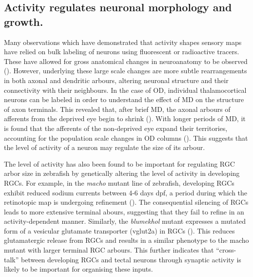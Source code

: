 \subsection{Activity regulates neuronal morphology and growth.}
Many observations which have demonstrated that activity shapes sensory maps have relied on bulk labeling of neurons using fluorescent or radioactive tracers. These have allowed for gross anatomical changes in neuroanatomy to be observed (\cite{Berry2016Experience-DependentSystem}). However, underlying these large scale changes are more subtle rearrangements in both axonal and dendritic arbours, altering neuronal structure and their connectivity with their neighbours. In the case of OD, individual thalamocortical neurons can be labeled in order to understand the effect of MD on the structure of axon terminals. This revealed that, after brief MD, the axonal arbours of afferents from the deprived eye begin to shrink (\cite{Antonini1993RapidCortex}). With longer periods of MD, it is found that the afferents of the non-deprived eye expand their territories, accounting for the population scale changes in OD columns (\cite{Antonini1996PlasticityCat.}). This suggests that the level of activity of a neuron may regulate the size of its arbour. 

The level of activity has also been found to be important for regulating RGC arbor size in zebrafish by genetically altering the level of activity in developing RGCs. For example, in the \textit{macho} mutant line of zebrafish, developing RGCs exhibit reduced sodium currents between 4-6 days \gls{dpf}, a period during which the retinotopic map is undergoing refinement (\cite{Gnuegge2001AnalysisMap}). The consequential silencing of RGCs leads to more extensive terminal abours, suggesting that they fail to refine in an activity-dependent manner. Similarly, the \textit{blumekhol} mutant expresses a mutated form of a vesicular glutamate transporter (vglut2a) in RGCs (\cite{Smear2007VesicularZebrafish}). This reduces glutamatergic release from RGCs and results in a similar phenotype to the macho mutant with larger terminal RGC arbours. This further indicates that “cross-talk” between developing RGCs and tectal neurons through synaptic activity is likely to be important for organising these inputs.

